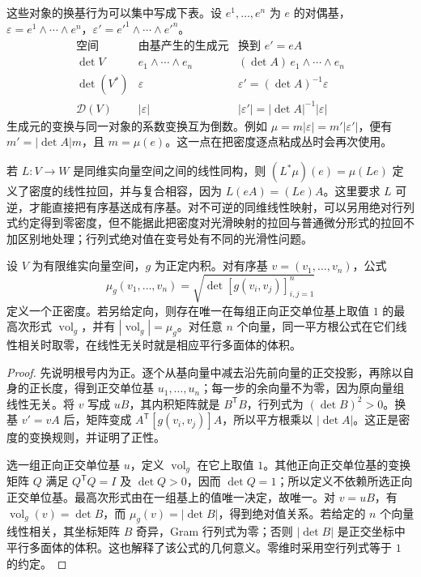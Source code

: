 这些对象的换基行为可以集中写成下表。设 \(e^1,\ldots,e^n\) 为 \(e\) 的对偶基，\(\varepsilon=e^1\wedge\cdots\wedge e^n\)，\(\varepsilon'=e'^1\wedge\cdots\wedge e'^n\)。
\[
	\begin{array}{c|c|c}
		\text{空间} & \text{由基产生的生成元} & \text{换到 }e'=eA\\ \hline
		\det V & e_1\wedge\cdots\wedge e_n & (\det A)\,e_1\wedge\cdots\wedge e_n\\
		\det(V^*) & \varepsilon & \varepsilon'=(\det A)^{-1}\varepsilon\\
		\mathcal D(V) & |\varepsilon| & |\varepsilon'|=|\det A|^{-1}|\varepsilon|
	\end{array}
\]
生成元的变换与同一对象的系数变换互为倒数。例如 \(\mu=m|\varepsilon|=m'|\varepsilon'|\)，便有 \(m'=|\det A|m\)，且 \(m=\mu(e)\)。这一点在把密度逐点粘成丛时会再次使用。

\ProseParagraphBreak

若 \(L:V\to W\) 是同维实向量空间之间的线性同构，则 \((L^*\mu)(e)=\mu(Le)\) 定义了密度的线性拉回，并与复合相容，因为 \(L(eA)=(Le)A\)。这里要求 \(L\) 可逆，才能直接把有序基送成有序基。对不可逆的同维线性映射，可以另用绝对行列式约定得到零密度，但不能据此把密度对光滑映射的拉回与普通微分形式的拉回不加区别地处理；行列式绝对值在变号处有不同的光滑性问题。

\begin{proposition}
	\label{g1:prop:gram-volume-density}
	设 \(V\) 为有限维实向量空间，\(g\) 为正定内积。对有序基 \(v=(v_1,\ldots,v_n)\)，公式
	\[
		\mu_g(v_1,\ldots,v_n)=\sqrt{\det[g(v_i,v_j)]_{i,j=1}^n}
	\]
	定义一个正密度。若另给定向，则存在唯一在每组正向正交单位基上取值 \(1\) 的最高次形式 \(\operatorname{vol}_g\)，并有 \(|\operatorname{vol}_g|=\mu_g\)。对任意 \(n\) 个向量，同一平方根公式在它们线性相关时取零，在线性无关时就是相应平行多面体的体积。
\end{proposition}
\begin{proof}
	先说明根号内为正。逐个从基向量中减去沿先前向量的正交投影，再除以自身的正长度，得到正交单位基 \(u_1,\ldots,u_n\)；每一步的余向量不为零，因为原向量组线性无关。将 \(v\) 写成 \(uB\)，其内积矩阵就是 \(B^{\mathsf T}B\)，行列式为 \((\det B)^2>0\)。换基 \(v'=vA\) 后，矩阵变成 \(A^{\mathsf T}[g(v_i,v_j)]A\)，所以平方根乘以 \(|\det A|\)。这正是密度的变换规则，并证明了正性。

	选一组正向正交单位基 \(u\)，定义 \(\operatorname{vol}_g\) 在它上取值 \(1\)。其他正向正交单位基的变换矩阵 \(Q\) 满足 \(Q^{\mathsf T}Q=I\) 及 \(\det Q>0\)，因而 \(\det Q=1\)；所以定义不依赖所选正向正交单位基。最高次形式由在一组基上的值唯一决定，故唯一。对 \(v=uB\)，有 \(\operatorname{vol}_g(v)=\det B\)，而 \(\mu_g(v)=|\det B|\)，得到绝对值关系。若给定的 \(n\) 个向量线性相关，其坐标矩阵 \(B\) 奇异，Gram 行列式为零；否则 \(|\det B|\) 是正交坐标中平行多面体的体积。这也解释了该公式的几何意义。零维时采用空行列式等于 \(1\) 的约定。
\end{proof}


